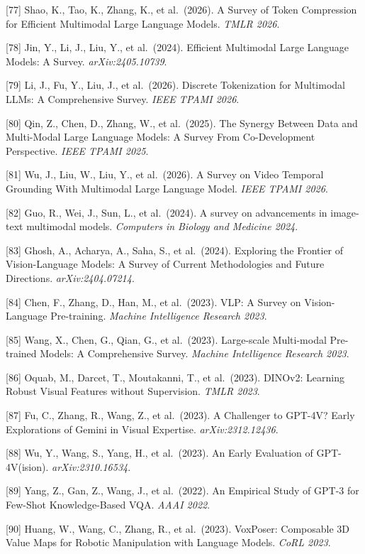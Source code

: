 {[}77{]} Shao, K., Tao, K., Zhang, K., et al.~(2026). A Survey of Token Compression for Efficient Multimodal Large Language Models. \emph{TMLR 2026}.

{[}78{]} Jin, Y., Li, J., Liu, Y., et al.~(2024). Efficient Multimodal Large Language Models: A Survey. \emph{arXiv:2405.10739}.

{[}79{]} Li, J., Fu, Y., Liu, J., et al.~(2026). Discrete Tokenization for Multimodal LLMs: A Comprehensive Survey. \emph{IEEE TPAMI 2026}.

{[}80{]} Qin, Z., Chen, D., Zhang, W., et al.~(2025). The Synergy Between Data and Multi-Modal Large Language Models: A Survey From Co-Development Perspective. \emph{IEEE TPAMI 2025}.

{[}81{]} Wu, J., Liu, W., Liu, Y., et al.~(2026). A Survey on Video Temporal Grounding With Multimodal Large Language Model. \emph{IEEE TPAMI 2026}.

{[}82{]} Guo, R., Wei, J., Sun, L., et al.~(2024). A survey on advancements in image-text multimodal models. \emph{Computers in Biology and Medicine 2024}.

{[}83{]} Ghosh, A., Acharya, A., Saha, S., et al.~(2024). Exploring the Frontier of Vision-Language Models: A Survey of Current Methodologies and Future Directions. \emph{arXiv:2404.07214}.

{[}84{]} Chen, F., Zhang, D., Han, M., et al.~(2023). VLP: A Survey on Vision-Language Pre-training. \emph{Machine Intelligence Research 2023}.

{[}85{]} Wang, X., Chen, G., Qian, G., et al.~(2023). Large-scale Multi-modal Pre-trained Models: A Comprehensive Survey. \emph{Machine Intelligence Research 2023}.

{[}86{]} Oquab, M., Darcet, T., Moutakanni, T., et al.~(2023). DINOv2: Learning Robust Visual Features without Supervision. \emph{TMLR 2023}.

{[}87{]} Fu, C., Zhang, R., Wang, Z., et al.~(2023). A Challenger to GPT-4V? Early Explorations of Gemini in Visual Expertise. \emph{arXiv:2312.12436}.

{[}88{]} Wu, Y., Wang, S., Yang, H., et al.~(2023). An Early Evaluation of GPT-4V(ision). \emph{arXiv:2310.16534}.

{[}89{]} Yang, Z., Gan, Z., Wang, J., et al.~(2022). An Empirical Study of GPT-3 for Few-Shot Knowledge-Based VQA. \emph{AAAI 2022}.

{[}90{]} Huang, W., Wang, C., Zhang, R., et al.~(2023). VoxPoser: Composable 3D Value Maps for Robotic Manipulation with Language Models. \emph{CoRL 2023}.

